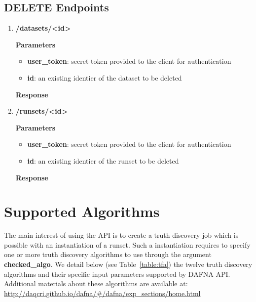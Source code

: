 \documentclass[a4paper,10pt]{scrartcl}
\begin{document}
\subsection{DELETE Endpoints}
\begin{enumerate}
\item \textbf{/datasets/<id>}
\textbf{Parameters}
\begin{itemize}
 \item \textbf{user\_token}: secret token provided to the client for authentication
 \item \textbf{id}: an existing identier of the dataset to be deleted 
\end{itemize}
\textbf{Response}
%
\item \textbf{/runsets/<id>}
\textbf{Parameters}
\begin{itemize}
  \item \textbf{user\_token}: secret token provided to the client for authentication
 \item \textbf{id}: an existing identier of the runset to be deleted 
\end{itemize}
\textbf{Response}
\end{enumerate}

\section{Supported Algorithms}\label{algorithms}
The main interest of using the API is to create a truth discovery job which is possible with an instantiation 
of a runset. Such a instantiation requires to specify one or more truth discovery algorithms to use through the
argument \textbf{checked\_algo}. We detail below (see Table~\ref{table:tfa}) the twelve truth discovery algorithms 
and their specific input parameters supported by DAFNA API. Additional materials about these algorithms are available
at: \href{http://daqcri.github.io/dafna/\#/dafna/exp\_sections/home.html}{\small{http://daqcri.github.io/dafna/\#/dafna/exp\_sections/home.html}}
\end{document}
